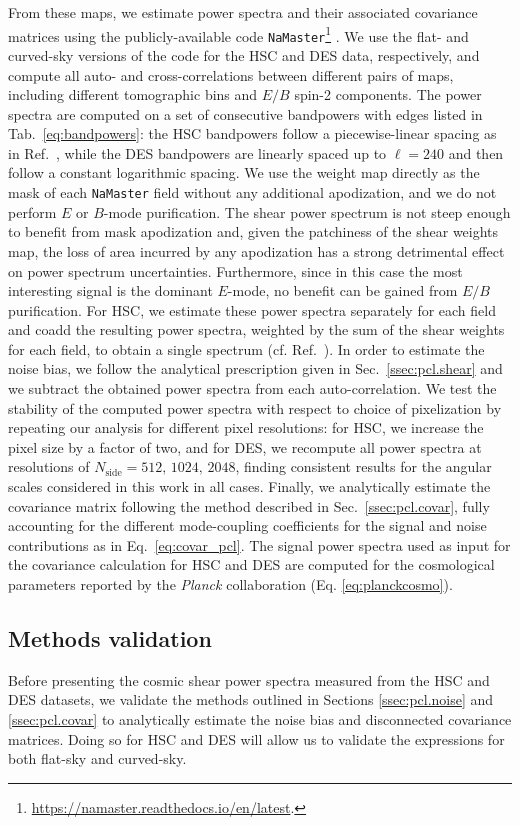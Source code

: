\documentclass[a4paper,11pt]{article}
\newcommand{\planck}{{\sl Planck}}
\newcommand{\nmt}{\texttt{NaMaster}}
\begin{document}
      From these maps, we estimate power spectra and their associated covariance matrices using the publicly-available code \nmt{}\footnote{\url{https://namaster.readthedocs.io/en/latest}.} \cite{1809.09603}. We use the flat- and curved-sky versions of the code for the HSC and DES data, respectively, and compute all auto- and cross-correlations between different pairs of maps, including different tomographic bins and $E/B$ spin-2 components. The power spectra are computed on a set of consecutive bandpowers with edges listed in Tab.~\ref{eq:bandpowers}: the HSC bandpowers follow a piecewise-linear spacing as in Ref.~\cite{1912.08209}, while the DES bandpowers are linearly spaced up to $\ell=240$ and then follow a constant logarithmic spacing. We use the weight map directly as the mask of each \nmt{} field without any additional apodization, and we do not perform $E$ or $B$-mode purification. The shear power spectrum is not steep enough to benefit from mask apodization and, given the patchiness of the shear weights map, the loss of area incurred by any apodization has a strong detrimental effect on power spectrum uncertainties. Furthermore, since in this case the most interesting signal is the dominant $E$-mode, no benefit can be gained from $E/B$ purification. For HSC, we estimate these power spectra separately for each field and coadd the resulting power spectra, weighted by the sum of the shear weights for each field, to obtain a single spectrum (cf. Ref.~\cite{1809.09148}). In order to estimate the noise bias, we follow the analytical prescription given in Sec.~\ref{ssec:pcl.shear} and we subtract the obtained power spectra from each auto-correlation. We test the stability of the computed power spectra with respect to choice of pixelization by repeating our analysis for different pixel resolutions: for HSC, we increase the pixel size by a factor of two, and for DES, we recompute all power spectra at resolutions of $N_{\mathrm{side}}=512,\,1024,\,2048$, finding consistent results for the angular scales considered in this work in all cases. Finally, we analytically estimate the covariance matrix following the method described in Sec.~\ref{ssec:pcl.covar}, fully accounting for the different mode-coupling coefficients for the signal and noise contributions as in Eq.~\ref{eq:covar_pcl}. The signal power spectra used as input for the covariance calculation for HSC and DES are computed for the cosmological parameters reported by the \planck{} collaboration (Eq. \ref{eq:planckcosmo}).
 
    \subsection{Methods validation}\label{ssec:results.method}
      Before presenting the cosmic shear power spectra measured from the HSC and DES datasets, we validate the methods outlined in Sections \ref{ssec:pcl.noise} and \ref{ssec:pcl.covar} to analytically estimate the noise bias and disconnected covariance matrices. Doing so for HSC and DES will allow us to validate the expressions for both flat-sky and  curved-sky.
\end{document}
